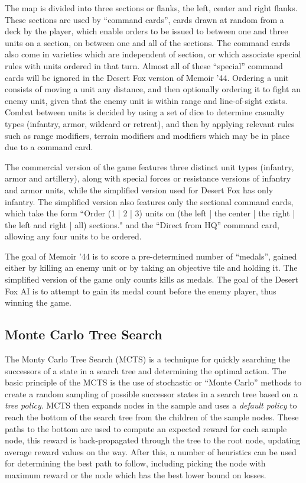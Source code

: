 \documentclass[twocolumn]{article}
\begin{document}
The map is divided into three sections or flanks, the left, center and right flanks. These sections are used by ``command cards'', cards drawn at random from a deck by the player, which enable orders to be issued to between one and three units on a section, on between one and all of the sections.
The command cards also come in varieties which are independent of section, or which associate special rules with units ordered in that turn.
Almost all of these ``special'' command cards will be ignored in the Desert Fox version of Memoir '44.
Ordering a unit consists of moving a unit any distance, and then optionally ordering it to fight an enemy unit, given that the enemy unit is within range and line-of-sight exists.
Combat between units is decided by using a set of dice to determine casualty types (infantry, armor, wildcard or retreat), and then by applying relevant rules such as range modifiers, terrain modifiers and modifiers which may be in place due to a command card.

The commercial version of the game features three distinct unit types (infantry, armor and artillery), along with special forces or resistance versions of infantry and armor units, while the simplified version used for Desert Fox has only infantry.
The simplified version also features only the sectional command cards, which take the form ``Order (1 | 2 | 3) units on (the left | the center | the right | the left and right | all) sections." and the ``Direct from HQ'' command card, allowing any four units to be ordered.

The goal of Memoir '44 is to score a pre-determined number of ``medals'', gained either by killing an enemy unit or by taking an objective tile and holding it.
The simplified version of the game only counts kills as medals.
The goal of the Desert Fox AI is to attempt to gain its medal count before the enemy player, thus winning the game.


\subsection{Monte Carlo Tree Search \cite{brown09}}

The Monty Carlo Tree Search (MCTS) is a technique for quickly searching the successors of a state in a search tree and determining the optimal action.
The basic principle of the MCTS is the use of stochastic or ``Monte Carlo'' methods to create a random sampling of possible successor states in a search tree based on a {\it tree policy}.
MCTS then expands nodes in the sample and uses a {\it default policy} to reach the bottom of the search tree from the children of the sample nodes.
These paths to the bottom are used to compute an expected reward for each sample node, this reward is back-propagated through the tree to the root node, updating average reward values on the way.
After this, a number of heuristics can be used for determining the best path to follow, including picking the node with maximum reward or the node which has the best lower bound on losses.
\end{document}
